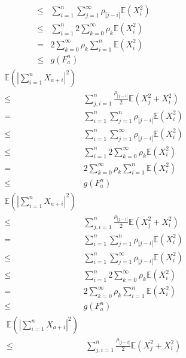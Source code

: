 \documentclass{ctexart}
\begin{document}
\begin{remark}
\begin{equation}
\begin{aligned}
      \leq & \sum_{i=1}^{n} \sum_{j=1}^{\infty} \rho_{|j-i|}\mathbb{E}(X_i^2)\\
      \leq & \sum_{i=1}^{n} 2\sum_{k=0}^{\infty} \rho_k \mathbb{E}(X_i^2)\\
      =& 2\sum_{k=0}^{\infty}\rho_k  \sum_{i=1}^{n}\mathbb{E}(X_i^2)\\
      \leq & g(F_a^n)
    \end{aligned}
  \end{equation}
  \begin{equation}
    \begin{aligned}
      \mathbb{E}(|\sum_{i=1}^{n}X_{a+i}|^2) \\
      \leq & \sum_{j,i = 1}^{n} \frac{\rho_{|j-i|}}{2}\mathbb{E}(X_j^2 + X_i^2)\\
      =& \sum_{i=1}^{n} \sum_{j=1}^{n}\rho_{|j-i|}\mathbb{E}(X_i^2)\\
      \leq & \sum_{i=1}^{n} \sum_{j=1}^{\infty} \rho_{|j-i|}\mathbb{E}(X_i^2)\\
      \leq & \sum_{i=1}^{n} 2\sum_{k=0}^{\infty} \rho_k \mathbb{E}(X_i^2)\\
      =& 2\sum_{k=0}^{\infty}\rho_k  \sum_{i=1}^{n}\mathbb{E}(X_i^2)\\
      \leq & g(F_a^n)
    \end{aligned}
  \end{equation}
  \begin{equation}
    \begin{aligned}
      \mathbb{E}(|\sum_{i=1}^{n}X_{a+i}|^2) \\
      \leq & \sum_{j,i = 1}^{n} \frac{\rho_{|j-i|}}{2}\mathbb{E}(X_j^2 + X_i^2)\\
      =& \sum_{i=1}^{n} \sum_{j=1}^{n}\rho_{|j-i|}\mathbb{E}(X_i^2)\\
      \leq & \sum_{i=1}^{n} \sum_{j=1}^{\infty} \rho_{|j-i|}\mathbb{E}(X_i^2)\\
      \leq & \sum_{i=1}^{n} 2\sum_{k=0}^{\infty} \rho_k \mathbb{E}(X_i^2)\\
      =& 2\sum_{k=0}^{\infty}\rho_k  \sum_{i=1}^{n}\mathbb{E}(X_i^2)\\
      \leq & g(F_a^n)
    \end{aligned}
  \end{equation}
  \begin{equation}
    \begin{aligned}
      \mathbb{E}(|\sum_{i=1}^{n}X_{a+i}|^2) \\
      \leq & \sum_{j,i = 1}^{n} \frac{\rho_{|j-i|}}{2}\mathbb{E}(X_j^2 + X_i^2)\\

\end{aligned}
\end{equation}
\end{remark}
\end{document}
